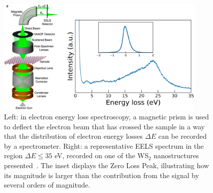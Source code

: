\begin{figure}[t]
    \centering
    \includegraphics[width=0.9\textwidth]{plots/EELS.pdf}
    \caption{Left: in electron energy loss spectroscopy, a magnetic
      prism is used to deflect the electron beam that has crossed the sample
      in a way that the distribution of electron energy losses $\Delta E$ can be recorded
      by a spectrometer.
      Right: a representative EELS spectrum in the region $\Delta E \le 35$ eV, recorded
      on one of the WS$_2$ nanostructures presented~\cite{SabryaWS2}.
      The inset displays the Zero Loss Peak, illustrating how
      its magnitude is larger than the contribution from the signal by several
      orders of magnitude.
      }
    \label{fig:EELS}
\end{figure}

